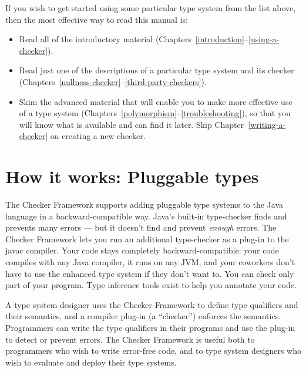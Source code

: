 If you wish to get started using some particular type system from the list
above, then the most effective way to read this manual is:

\begin{itemize}
\item
  Read all of the introductory material
  (Chapters~\ref{introduction}--\ref{using-a-checker}).
\item
  Read just one of the descriptions of a particular type system and its
  checker (Chapters~\ref{nullness-checker}--\ref{third-party-checkers}).
\item
  Skim the advanced material that will enable you to make more effective
  use of a type system
  (Chapters~\ref{polymorphism}--\ref{troubleshooting}), so that you will
  know what is available and can find it later.  Skip
  Chapter~\ref{writing-a-checker} on creating a new checker.
\end{itemize}


\section{How it works:  Pluggable types\label{pluggable-types}}

The Checker Framework supports adding
pluggable type systems to the Java language in a backward-compatible way.
Java's built-in type-checker finds and prevents many errors --- but it
doesn't find and prevent \emph{enough} errors.  The Checker Framework lets you
run an additional type-checker as a plug-in to the javac compiler.  Your
code stays completely backward-compatible:  your code compiles with any
Java compiler, it runs on any JVM, and your coworkers don't have to use the
enhanced type system if they don't want to.  You can check only part of
your program.  Type inference tools exist to help you annotate your
code.


A type system designer uses the Checker Framework to define type qualifiers
and their semantics, and a
compiler plug-in (a ``checker'') enforces the semantics.  Programmers can
write the type qualifiers in their programs and use the plug-in to detect
or prevent errors.  The Checker Framework is useful both to programmers who
wish to write error-free code, and to type system designers who wish to
evaluate and deploy their type systems.



